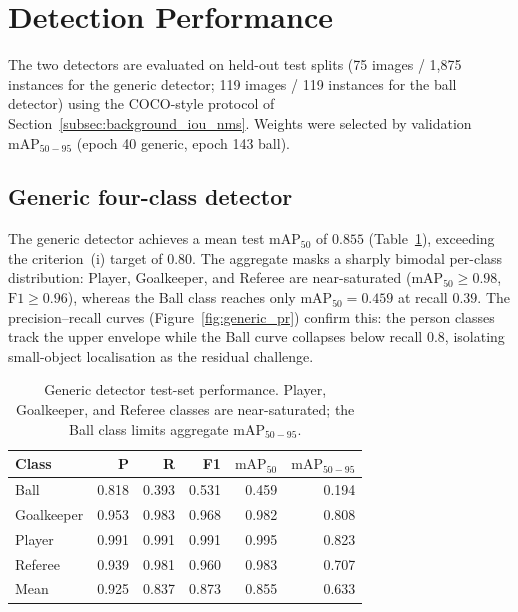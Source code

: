 \section{Detection Performance}
\label{sec:eval_detection}

The two detectors are evaluated on held-out test splits (75 images /
1{,}875 instances for the generic detector; 119 images / 119 instances
for the ball detector) using the COCO-style protocol of
Section~\ref{subsec:background_iou_nms}. Weights were selected by
validation \texttt{$\mathrm{mAP}_{50-95}$} (epoch 40 generic, epoch 143 ball).

\subsection{Generic four-class detector}

The generic detector achieves a mean test \texttt{$\mathrm{mAP}_{50}$} of $0.855$
(Table~\ref{tab:detector_per_class}), exceeding the criterion~(i)
target of $0.80$. The aggregate masks a sharply bimodal per-class
distribution: Player, Goalkeeper, and Referee are near-saturated
($\text{$\mathrm{mAP}_{50}$} \geq 0.98$, $\text{F1} \geq 0.96$), whereas the Ball
class reaches only $\text{$\mathrm{mAP}_{50}$} = 0.459$ at recall $0.39$. The
precision--recall curves (Figure~\ref{fig:generic_pr}) confirm this:
the person classes track the upper envelope while the Ball curve
collapses below recall $0.8$, isolating small-object localisation as
the residual challenge.

\begin{table}[h]
\centering
\small
\begin{tabular}{lrrrrr}
\toprule
Class & P & R & F1 & $\mathrm{mAP}_{50}$ &$\mathrm{mAP}_{50-95}$ \\
\midrule
Ball       & 0.818 & 0.393 & 0.531 & 0.459 & 0.194 \\
Goalkeeper & 0.953 & 0.983 & 0.968 & 0.982 & 0.808 \\
Player     & 0.991 & 0.991 & 0.991 & 0.995 & 0.823 \\
Referee    & 0.939 & 0.981 & 0.960 & 0.983 & 0.707 \\
\midrule
Mean       & 0.925 & 0.837 & 0.873 & 0.855 & 0.633 \\
\bottomrule
\end{tabular}
\caption[Generic detector: per-class test performance.]{Generic
detector test-set performance. Player, Goalkeeper, and Referee classes
are near-saturated; the Ball class limits aggregate
\texttt{$\mathrm{mAP}_{50-95}$}.}
\label{tab:detector_per_class}
\end{table}

